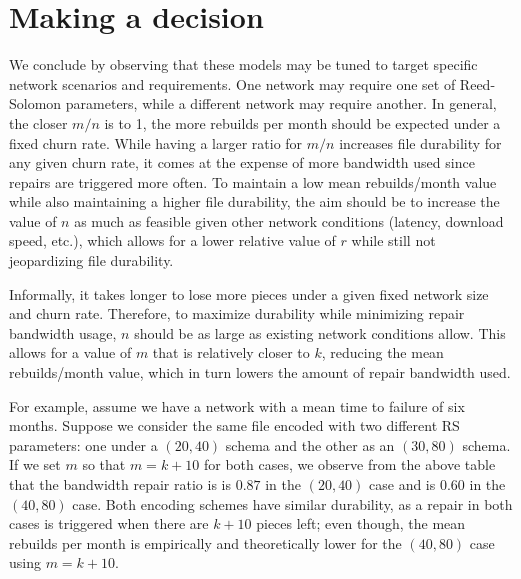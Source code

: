\section{Making a decision}

We conclude by observing that these models may be tuned to target specific network scenarios and requirements. One network may require one set of Reed-Solomon parameters, while a different network may require another. In general, the closer $m/n$ is to 1, the more rebuilds per month should be expected under a fixed churn rate. While having a larger ratio for $m/n$ increases file durability for any given churn rate, it comes at the expense of more bandwidth used since repairs are triggered more often. To maintain a low mean rebuilds/month value while also maintaining a higher file durability, the aim should be to increase the value of $n$ as much as feasible given other network conditions (latency, download speed, etc.), which allows for a lower relative value of $r$ while still not jeopardizing file durability.

Informally, it takes longer to lose more pieces under a given fixed network size and churn rate. Therefore, to maximize durability while minimizing repair bandwidth usage, $n$ should be as large as existing network conditions allow. This allows for a value of $m$ that is relatively closer to $k$, reducing the mean rebuilds/month value, which in turn lowers the amount of repair bandwidth used.

For example, assume we have a network with a mean time to failure of six months.
Suppose we consider the same file encoded with two different RS parameters:
one under a $(20,40)$ schema and the other as an $(30,80)$ schema. If we set $m$ so that $m=k+10$ for both cases, we observe from the above table
that the bandwidth repair ratio is is $0.87$ in the $(20,40)$ case and is $0.60$ in the $(40,80)$ case. Both encoding schemes have similar durability, as a repair in both cases is triggered when there are $k+10$ pieces left; even though, the mean rebuilds per month
is empirically and theoretically lower for the $(40,80)$ case using $m=k+10$.

